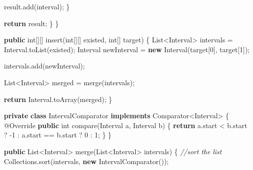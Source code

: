\documentclass[]{book}
\newenvironment{Shaded}{\begin{snugshade}}{\end{snugshade}}
\newcommand{\AttributeTok}[1]{\textcolor[rgb]{0.77,0.63,0.00}{#1}}
\newcommand{\BuiltInTok}[1]{#1}
\newcommand{\CommentTok}[1]{\textcolor[rgb]{0.56,0.35,0.01}{\textit{#1}}}
\newcommand{\DataTypeTok}[1]{\textcolor[rgb]{0.13,0.29,0.53}{#1}}
\newcommand{\DecValTok}[1]{\textcolor[rgb]{0.00,0.00,0.81}{#1}}
\newcommand{\FunctionTok}[1]{\textcolor[rgb]{0.00,0.00,0.00}{#1}}
\newcommand{\KeywordTok}[1]{\textcolor[rgb]{0.13,0.29,0.53}{\textbf{#1}}}
\newcommand{\NormalTok}[1]{#1}
\begin{document}
\begin{Shaded}
\begin{Highlighting}[]
\NormalTok{            result.}\FunctionTok{add}\NormalTok{(interval);}
\NormalTok{        \}}

        \KeywordTok{return}\NormalTok{ result;}
\NormalTok{    \}}
\NormalTok{\}}

\KeywordTok{public} \DataTypeTok{int}\NormalTok{[][] }\FunctionTok{insert}\NormalTok{(}\DataTypeTok{int}\NormalTok{[][] existed, }\DataTypeTok{int}\NormalTok{[] target) \{}
    \BuiltInTok{List}\NormalTok{<Interval> intervals = Interval.}\FunctionTok{toList}\NormalTok{(existed);}
\NormalTok{    Interval newInterval = }\KeywordTok{new} \FunctionTok{Interval}\NormalTok{(target[}\DecValTok{0}\NormalTok{], target[}\DecValTok{1}\NormalTok{]);}

\NormalTok{    intervals.}\FunctionTok{add}\NormalTok{(newInterval);}

    \BuiltInTok{List}\NormalTok{<Interval> merged = }\FunctionTok{merge}\NormalTok{(intervals);}

    \KeywordTok{return}\NormalTok{ Interval.}\FunctionTok{toArray}\NormalTok{(merged);}
\NormalTok{\}}

\KeywordTok{private} \KeywordTok{class}\NormalTok{ IntervalComparator }\KeywordTok{implements} \BuiltInTok{Comparator}\NormalTok{<Interval> \{}
    \AttributeTok{@Override}
    \KeywordTok{public} \DataTypeTok{int} \FunctionTok{compare}\NormalTok{(Interval a, Interval b) \{}
        \KeywordTok{return}\NormalTok{ a.}\FunctionTok{start}\NormalTok{ < b.}\FunctionTok{start}\NormalTok{ ? }\DecValTok{-1}\NormalTok{ : a.}\FunctionTok{start}\NormalTok{ == b.}\FunctionTok{start}\NormalTok{ ? }\DecValTok{0}\NormalTok{ : }\DecValTok{1}\NormalTok{;}
\NormalTok{    \}}
\NormalTok{\}}

\KeywordTok{public} \BuiltInTok{List}\NormalTok{<Interval> }\FunctionTok{merge}\NormalTok{(}\BuiltInTok{List}\NormalTok{<Interval> intervals) \{}
    \CommentTok{//sort the list}
    \BuiltInTok{Collections}\NormalTok{.}\FunctionTok{sort}\NormalTok{(intervals, }\KeywordTok{new} \FunctionTok{IntervalComparator}\NormalTok{());}


\end{Highlighting}
\end{Shaded}
\end{document}
